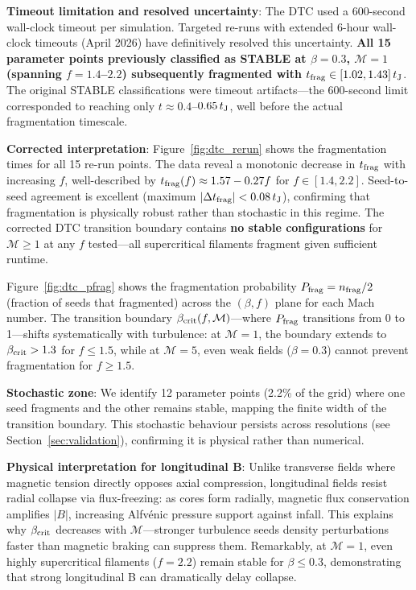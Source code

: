 \documentclass[twoside,twocolumn]{mnras}
\begin{document}
\textbf{Timeout limitation and resolved uncertainty}: The DTC used a 600-second wall-clock timeout per simulation. Targeted re-runs with extended 6-hour wall-clock timeouts (April 2026) have definitively resolved this uncertainty. \textbf{All 15 parameter points previously classified as STABLE at $\beta = 0.3$, $\mathcal{M} = 1$ (spanning $f = 1.4$--$2.2$) subsequently fragmented with $t_{\rm frag} \in [1.02, 1.43]\,t_{\rm J}$}. The original STABLE classifications were timeout artifacts—the 600-second limit corresponded to reaching only $t \approx 0.4$--$0.65\,t_{\rm J}$, well before the actual fragmentation timescale.

\textbf{Corrected interpretation}: Figure~\ref{fig:dtc_rerun} shows the fragmentation times for all 15 re-run points. The data reveal a monotonic decrease in $t_{\rm frag}$ with increasing $f$, well-described by $t_{\rm frag}(f) \approx 1.57 - 0.27f$ for $f \in [1.4, 2.2]$. Seed-to-seed agreement is excellent (maximum $|\Delta t_{\rm frag}| < 0.08\,t_{\rm J}$), confirming that fragmentation is physically robust rather than stochastic in this regime. The corrected DTC transition boundary contains \textbf{no stable configurations} for $\mathcal{M} \geq 1$ at any $f$ tested—all supercritical filaments fragment given sufficient runtime.

Figure~\ref{fig:dtc_pfrag} shows the fragmentation probability $P_{\rm frag} = n_{\rm frag}/2$ (fraction of seeds that fragmented) across the $(\beta, f)$ plane for each Mach number. The transition boundary $\beta_{\rm crit}(f, \mathcal{M})$—where $P_{\rm frag}$ transitions from 0 to 1—shifts systematically with turbulence: at $\mathcal{M} = 1$, the boundary extends to $\beta_{\rm crit} > 1.3$ for $f \leq 1.5$, while at $\mathcal{M} = 5$, even weak fields ($\beta = 0.3$) cannot prevent fragmentation for $f \geq 1.5$.

\textbf{Stochastic zone}: We identify 12 parameter points (2.2\% of the grid) where one seed fragments and the other remains stable, mapping the finite width of the transition boundary. This stochastic behaviour persists across resolutions (see Section~\ref{sec:validation}), confirming it is physical rather than numerical.

\textbf{Physical interpretation for longitudinal B}: Unlike transverse fields where magnetic tension directly opposes axial compression, longitudinal fields resist radial collapse via flux-freezing: as cores form radially, magnetic flux conservation amplifies $|B|$, increasing Alfv\'enic pressure support against infall. This explains why $\beta_{\rm crit}$ decreases with $\mathcal{M}$—stronger turbulence seeds density perturbations faster than magnetic braking can suppress them. Remarkably, at $\mathcal{M} = 1$, even highly supercritical filaments ($f = 2.2$) remain stable for $\beta \leq 0.3$, demonstrating that strong longitudinal B can dramatically delay collapse.
\end{document}

